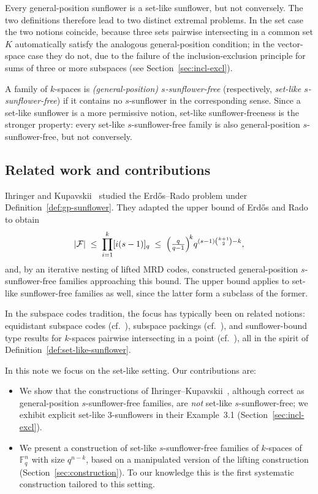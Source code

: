 \documentclass[11pt]{article}
\theoremstyle{definition}
\newcommand{\F}{\mathbb{F}}
\begin{document}
Every general-position sunflower is a set-like sunflower, but not conversely. The two definitions therefore lead to two distinct extremal problems. In the set case the two notions coincide, because three sets pairwise intersecting in a common set $K$ automatically satisfy the analogous general-position condition; in the vector-space case they do not, due to the failure of the inclusion-exclusion principle for sums of three or more subspaces (see Section~\ref{sec:incl-excl}).

A family of $k$-spaces is \emph{(general-position) $s$-sunflower-free} (respectively, \emph{set-like $s$-sunflower-free}) if it contains no $s$-sunflower in the corresponding sense. Since a set-like sunflower is a more permissive notion, set-like sunflower-freeness is the stronger property: every set-like $s$-sunflower-free family is also general-position $s$-sunflower-free, but not conversely.

\subsection{Related work and contributions}

Ihringer and Kupavskii~\cite{ik2026} studied the Erd\H{o}s--Rado problem under Definition~\ref{def:gp-sunflower}. They adapted the upper bound of Erd\H{o}s and Rado to obtain
\[
|\mathcal{F}| \;\leq\; \prod_{i=1}^k [i(s-1)]_q \;\leq\; \Bigl(\tfrac{q}{q-1}\Bigr)^{\!k} q^{(s-1)\binom{k+1}{2} - k},
\]
and, by an iterative nesting of lifted MRD codes, constructed general-position $s$-sunflower-free families approaching this bound. The upper bound applies to set-like sunflower-free families as well, since the latter form a subclass of the former.

In the subspace codes tradition, the focus has typically been on related notions: equidistant subspace codes (cf.~\cite{etzion-raviv}), subspace packings (cf.~\cite{ekop-subspace-packings}), and sunflower-bound type results for $k$-spaces pairwise intersecting in a point (cf.~\cite{bdh}), all in the spirit of Definition~\ref{def:set-like-sunflower}.

In this note we focus on the set-like setting. Our contributions are:
\begin{itemize}[leftmargin=*, itemsep=2pt]
  \item We show that the constructions of Ihringer--Kupavskii~\cite{ik2026}, although correct as general-position $s$-sunflower-free families, are \emph{not} set-like $s$-sunflower-free; we exhibit explicit set-like $3$-sunflowers in their Example~3.1 (Section~\ref{sec:incl-excl}).
  \item We present a construction of set-like $s$-sunflower-free families of $k$-spaces of $\F_q^n$ with size $q^{n-k}$, based on a manipulated version of the lifting construction (Section~\ref{sec:construction}). To our knowledge this is the first systematic construction tailored to this setting.
\end{itemize}
\end{document}
